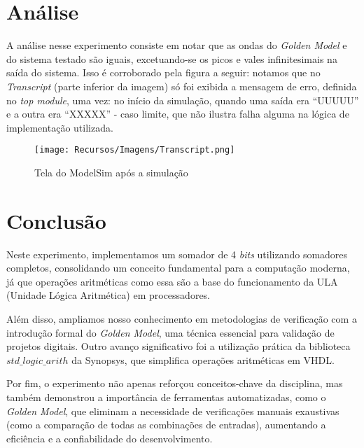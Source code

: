 \documentclass[a4paper,12pt]{article}
\begin{document}
\newpage

\section{Análise}
A análise nesse experimento consiste em notar que as ondas do \textit{Golden Model} e do sistema testado são iguais, excetuando-se os picos e vales infinitesimais na saída do sistema. Isso é corroborado pela figura a seguir: notamos que no \textit{Transcript} (parte inferior da imagem) só foi exibida a mensagem de erro, definida no \textit{top module}, uma vez: no início da simulação, quando uma saída era ``UUUUU'' e a outra era ``XXXXX'' - caso limite, que não ilustra falha alguma na lógica de implementação utilizada.
\begin{figure}[H]
    \centering
    \texttt{[image: Recursos/Imagens/Transcript.png]}
    \caption{Tela do ModelSim após a simulação}
\end{figure}

\section{Conclusão}
Neste experimento, implementamos um somador de 4 \textit{bits} utilizando somadores completos, consolidando um conceito fundamental para a computação moderna, já que operações aritméticas como essa são a base do funcionamento da ULA (Unidade Lógica Aritmética) em processadores.

Além disso, ampliamos nosso conhecimento em metodologias de verificação com a introdução formal do \textit{Golden Model}, uma técnica essencial para validação de projetos digitais. Outro avanço significativo foi a utilização prática da biblioteca $std\_logic\_arith$ da Synopsys, que simplifica operações aritméticas em VHDL.

Por fim, o experimento não apenas reforçou conceitos-chave da disciplina, mas também demonstrou a importância de ferramentas automatizadas, como o \textit{Golden Model}, que eliminam a necessidade de verificações manuais exaustivas (como a comparação de todas as combinações de entradas), aumentando a eficiência e a confiabilidade do desenvolvimento.
\end{document}
